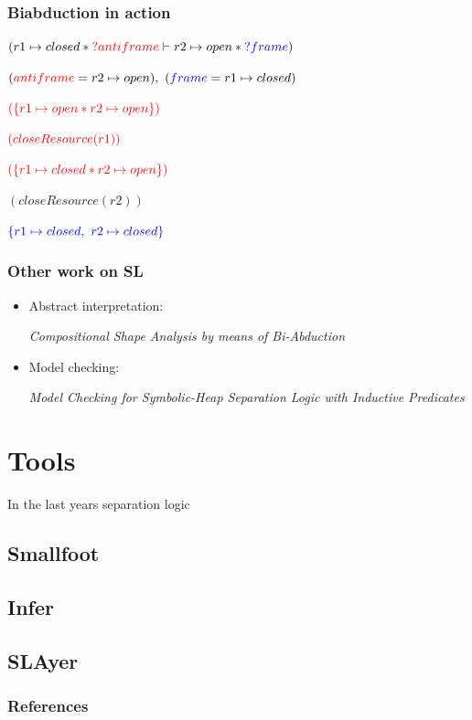 \documentclass[professionalfont]{beamer}
\begin{document}
    \begin{frame}
        \frametitle{Biabduction in action}
        $(r1\mapsto closed \ast \textcolor{red}{?antiframe} \vdash r2 \mapsto open \ast \textcolor{blue}{?frame})$
        \small

        \bigskip
        \pause
        $(\textcolor{red}{antiframe} = r2 \mapsto open),\ (\textcolor{blue}{frame}=r1 \mapsto closed)$

        \bigskip
        \pause
        
        $\textcolor{red}{(\{r1 \mapsto open \ast r2 \mapsto open\})}$
        
        $\textcolor{red}{(closeResource(r1))}$
        
        $\textcolor{red}{(\{r1 \mapsto closed \ast r2 \mapsto open\})}$
        
        $(closeResource(r2))$

        $\textcolor{blue}{\{r1 \mapsto closed,\ r2 \mapsto closed\}}$

    \end{frame}

    \begin{frame}
        \frametitle{Other work on SL}

        \begin{itemize}
            \item Abstract interpretation:
            
            \medskip
            \emph{Compositional Shape Analysis by means of Bi-Abduction} \cite{calcagno2009compositional}

            \bigskip
            \item  Model checking:
            
            \medskip
            \emph{Model Checking for Symbolic-Heap Separation Logic with
Inductive Predicates} \cite{modelchecking}
        \end{itemize}
    \end{frame}
    \section{Tools} 
    In the last years separation logic
    \subsection{Smallfoot}
    \subsection{Infer}
    \subsection{SLAyer}
    \begin{frame}[allowframebreaks]
     
        \nocite{*}
        \frametitle{References}
        
        
    \end{frame}
\end{document}
